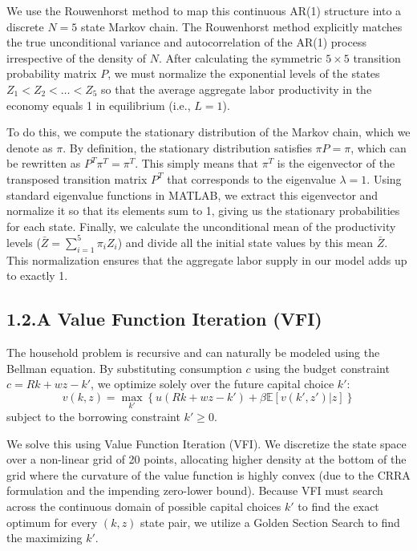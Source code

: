 \documentclass[11pt, a4paper]{article}
\begin{document}
We use the Rouwenhorst method to map this continuous AR(1) structure into a discrete $N=5$ state Markov chain. The Rouwenhorst method explicitly matches the true unconditional variance and autocorrelation of the AR(1) process irrespective of the density of $N$. After calculating the symmetric $5 \times 5$ transition probability matrix $P$, we must normalize the exponential levels of the states $Z_1 < Z_2 < \dots < Z_5$ so that the average aggregate labor productivity in the economy equals 1 in equilibrium (i.e., $L=1$). 

To do this, we compute the stationary distribution of the Markov chain, which we denote as $\pi$. By definition, the stationary distribution satisfies $\pi P = \pi$, which can be rewritten as $P^T \pi^T = \pi^T$. This simply means that $\pi^T$ is the eigenvector of the transposed transition matrix $P^T$ that corresponds to the eigenvalue $\lambda = 1$. Using standard eigenvalue functions in MATLAB, we extract this eigenvector and normalize it so that its elements sum to 1, giving us the stationary probabilities for each state. Finally, we calculate the unconditional mean of the productivity levels ($\bar{Z} = \sum_{i=1}^5 \pi_i Z_i$) and divide all the initial state values by this mean $\bar{Z}$. This normalization ensures that the aggregate labor supply in our model adds up to exactly 1.

\subsection*{1.2.A Value Function Iteration (VFI)}
The household problem is recursive and can naturally be modeled using the Bellman equation. By substituting consumption $c$ using the budget constraint $c = Rk + wz - k'$, we optimize solely over the future capital choice $k'$:
\begin{equation}
    v(k, z) = \max_{k'} \left\{ u(Rk + wz - k') + \beta \mathbb{E}[v(k', z') | z] \right\}
\end{equation}
subject to the borrowing constraint $k' \geq 0$.

We solve this using Value Function Iteration (VFI). We discretize the state space over a non-linear grid of 20 points, allocating higher density at the bottom of the grid where the curvature of the value function is highly convex (due to the CRRA formulation and the impending zero-lower bound). Because VFI must search across the continuous domain of possible capital choices $k'$ to find the exact optimum for every $(k, z)$ state pair, we utilize a Golden Section Search to find the maximizing $k'$.
\end{document}
